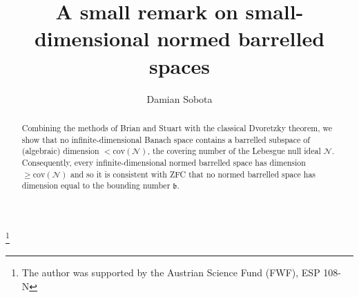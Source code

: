 \documentclass[a4paper,11pt,fleqn]{amsart}
\theoremstyle{definition}
\theoremstyle{remark}
\numberwithin{equation}{section}
\begin{document}
\title{A small remark on small-dimensional normed barrelled spaces}


\author[D.\ Sobota]{Damian Sobota}
\address{Kurt G\"{o}del Research Center, Department of Mathematics, University of Vienna, Vienna, Austria.}


\thanks{The author was supported by the Austrian Science Fund (FWF), ESP 108-N}


\begin{abstract}
Combining the methods of Brian and Stuart with the classical Dvoretzky theorem, we show that no infinite-dimensional Banach space contains a barrelled subspace of (algebraic) dimension $<\mbox{cov}(\mathcal{N})$, the covering number of the Lebesgue null ideal $\mathcal{N}$. Consequently, every infinite-dimensional normed barrelled space has dimension $\ge\mbox{cov}(\mathcal{N})$ and so it is consistent with \textsf{ZFC} that no normed barrelled space has dimension equal to the bounding number $\mathfrak{b}$. 
\end{abstract}


\maketitle
\end{document}
